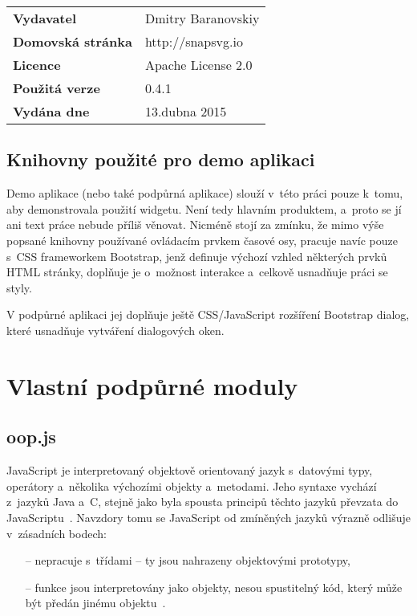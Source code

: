 		\vspace{\baselineskip}
		\renewcommand{\arraystretch}{1.3}
		\noindent
		\begin{tabularx}{\textwidth}{|lX|}
		\hline
		\bf Vydavatel & Dmitry Baranovskiy \\
		\bf Domovská stránka & http://snapsvg.io\\
		\bf Licence & Apache License 2.0 \\
		\bf Použitá verze & 0.4.1\\
		\bf Vydána dne & 13.\ts dubna 2015\\
		\hline
		\end{tabularx}
		
		
		\subsection{Knihovny použité pro demo aplikaci}
			Demo aplikace (nebo také podpůrná aplikace) slouží v~této práci pouze k~tomu, aby demonstrovala použití widgetu. Není tedy hlavním produktem, a~proto se jí ani text práce nebude příliš věnovat. Nicméně stojí za zmínku, že mimo výše popsané knihovny používané ovládacím prvkem časové osy, pracuje navíc pouze s~CSS frameworkem {\sf Bootstrap}, jenž definuje výchozí vzhled některých prvků HTML stránky, doplňuje je o~možnost interakce a~celkově usnadňuje práci se styly.
			
			V podpůrné aplikaci jej doplňuje ještě CSS/JavaScript rozšíření {\sf Bootstrap dialog}, které usnadňuje vytváření dialogových oken.
				
	\section{Vlastní podpůrné moduly}
		\label{vlastni-moduly}
		\subsection{\sf oop.js}
		\label{oopjs}
		JavaScript je interpretovaný objektově orientovaný jazyk s~datovými typy, operá\-tory a~několika výchozími objekty a~metodami. Jeho syntaxe vychází z~jazyků Java a~C, stejně jako byla spousta principů těchto jazyků převzata do Java\-Scriptu~\cite{mozdev-js-intro}. Navzdory tomu se JavaScript od zmíněných jazyků výrazně odlišuje v~zásad\-ních bodech:
		\begin{itemize}
			\item[--] nepracuje s~třídami -- ty jsou nahrazeny objektovými prototypy,
			\item[--] funkce jsou interpretovány jako objekty, nesou spustitelný kód, který může být předán jinému objektu~\cite{mozdev-js-intro}.
		\end{itemize}
		
